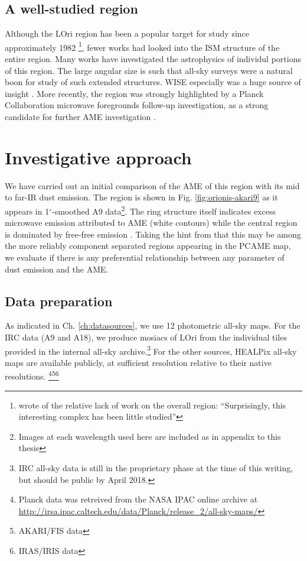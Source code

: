   \subsection{A well-studied region}
    Although the LOri region has been a popular target for study since approximately 1982 \footnote{\cite{duerr82} wrote of the relative lack of work on the overall region: ``Surprisingly, this interesting complex has been little studied''}, fewer works had looked into the ISM structure of the entire region.  Many works have investigated the astrophysics of individul portions of this region. The large angular size is such that all-sky surveys were a natural boon for study of such extended structures. WISE especially was a huge source of insight \citep{koenig15}. More recently, the region was strongly highlighted by a Planck Collaboration microwave foregrounds follow-up investigation, as a strong candidate for further AME investigation \citep{planck15XXV}.


	\section{Investigative approach}

      We have carried out an initial comparison of the AME of this region with its mid to far-IR dust emission. The region is shown in Fig. \ref{fig:orionis-akari9} as it appears in 1$^{\circ}$-smoothed A9 data\footnote{Images at each wavelength used here are included as in appendix to this thesis}. The ring structure itself indicates excess microwave emission attributed to AME (white contours) while the central region is dominated by free-free emission \citep{aran09, koenig15,planck15XXV}. Taking the hint from \cite{planck15XXV} that this may be among the more reliably component separated regions appearing in the PCAME map, we evaluate if there is any preferential relationship between any parameter of dust emission and the AME.

		\subsection{Data preparation}
			As indicated in Ch. \hyperref[ch:datasources]{\ref{ch:datasources}}, we use 12 photometric all-sky maps. For the IRC data (A9 and A18), we produce mosiacs of LOri from the individual tiles provided in the internal all-sky archive.\footnote{IRC all-sky data is still in the proprietary phase at the time of this writing, but should be public by April 2018.} For the other sources, HEALPix all-sky maps are available publicly, at sufficient resolution relative to their native resolutions. \footnote{Planck data was retreived from the NASA IPAC online archive at \url{http://irsa.ipac.caltech.edu/data/Planck/release_2/all-sky-maps/}}\footnote{AKARI/FIS data }\footnote{IRAS/IRIS data }

